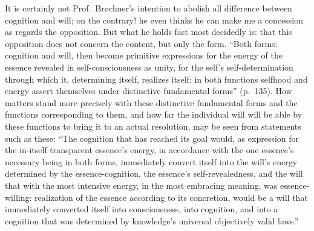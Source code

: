 \documentclass[12pt]{book}
\newcommand{\opage}[1]{\marginnote{\footnotesize\textit{[#1]}}}
\begin{document}
It is certainly not Prof.~Brøchner's intention to abolish all difference
between cognition and will; on the contrary! he even thinks he can make me
a concession as regards the opposition. But what he holds fast most
decidedly is: that this opposition does not concern the content, but only
the form. ``Both forms: cognition and will, then become primitive
expressions for the energy of the essence revealed in self-consciousness as
unity, for the self's self-determination through which it, determining
itself, realizes itself: in both functions selfhood and energy assert
themselves under distinctive fundamental forms'' (p.\ 135). How matters
stand more precisely with these distinctive fundamental forms and the
functions corresponding to them, and how far the individual will will be
able by these functions to bring it to an actual resolution, may be seen
from statements such as these: ``The cognition that has reached its goal
would, as expression for the in-itself
\opage{37}\setcounter{footnote}{0}%
transparent essence's energy, in accordance with the one essence's
necessary being in both forms, immediately convert itself into the will's
energy determined by the essence-cognition, the essence's
self-revealedness, and the will that with the most intensive energy, in
the most embracing meaning, was essence-willing: realization of the essence
according to its concretion, would be a will that immediately converted
itself into consciousness, into cognition, and into a cognition that was
determined by knowledge's universal objectively valid laws.''
\end{document}
